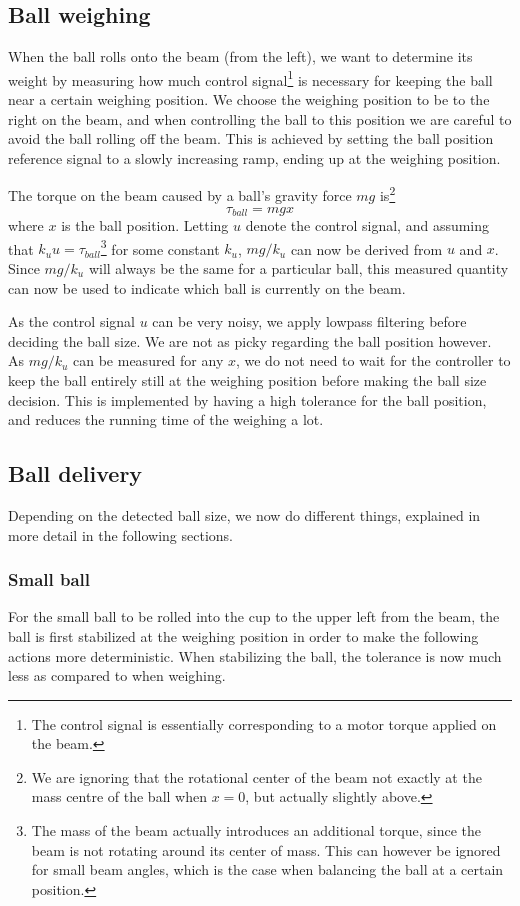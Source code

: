 \subsection{Ball weighing}\label{sec:ball_weighing}
When the ball rolls onto the beam (from the left), we want to determine its weight by measuring how much control signal\footnote{The control signal is essentially corresponding to a motor torque applied on the beam.} is necessary for keeping the ball near a certain weighing position.
We choose the weighing position to be to the right on the beam, and when controlling the ball to this position we are careful to avoid the ball rolling off the beam.
This is achieved by setting the ball position reference signal to a slowly increasing ramp, ending up at the weighing position.

The torque on the beam caused by a ball's gravity force $mg$ is\footnote{We are ignoring that the rotational center of the beam not exactly at the mass centre of the ball when $x=0$, but actually slightly above.}
\[
\tau_{ball} = mgx
\]
where $x$ is the ball position. Letting $u$ denote the control signal, and assuming that $k_u u = \tau_{ball}$\footnote{The mass of the beam actually introduces an additional torque, since the beam is not rotating around its center of mass.
This can however be ignored for small beam angles, which is the case when balancing the ball at a certain position.} for some constant $k_u$, $mg/k_u$ can now be derived from $u$ and $x$.
Since $mg/k_u$ will always be the same for a particular ball, this measured quantity can now be used to indicate which ball is currently on the beam.

As the control signal $u$ can be very noisy, we apply lowpass filtering before deciding the ball size.
We are not as picky regarding the ball position however.
As $mg/k_u$ can be measured for any $x$, we do not need to wait for the controller to keep the ball entirely still at the weighing position before making the ball size decision.
This is implemented by having a high tolerance for the ball position, and reduces the running time of the weighing a lot.

\subsection{Ball delivery}\label{sec:ball_delivery}
Depending on the detected ball size, we now do different things, explained in more detail in the following sections.

\subsubsection{Small ball}\label{sec:small_ball_delivery}
For the small ball to be rolled into the cup to the upper left from the beam, the ball is first stabilized at the weighing position in order to make the following actions more deterministic.
When stabilizing the ball, the tolerance is now much less as compared to when weighing.



